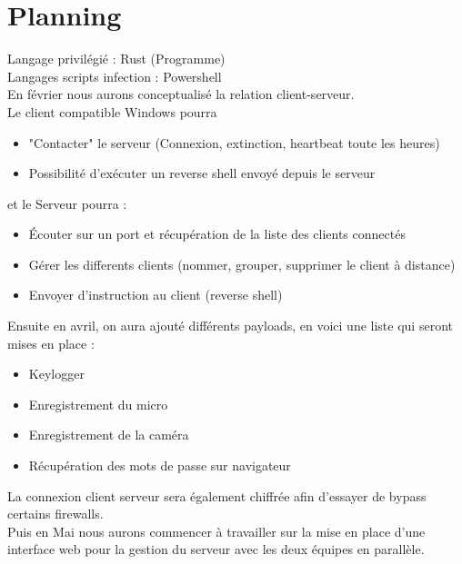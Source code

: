 \documentclass[a4paper]{article}
\begin{document}
   \section{Planning}
Langage privilégié : Rust (Programme)\\
Langages scripts infection : Powershell
\bigskip
\\
En février nous aurons conceptualisé la relation client-serveur.\\
Le client compatible Windows pourra
 \begin{itemize}
\item "Contacter" le serveur (Connexion, extinction, heartbeat toute les heures)
\item Possibilité d'exécuter un reverse shell envoyé depuis le serveur
\end{itemize}
et le Serveur pourra :
 \begin{itemize}
\item Écouter sur un port et récupération de la liste des clients connectés
\item Gérer les differents clients (nommer, grouper, supprimer le client à distance)
\item Envoyer d'instruction au client (reverse shell)
\end{itemize}
\bigskip
Ensuite en avril, on aura ajouté différents payloads, en voici une liste qui seront mises en place :
 \begin{itemize}
\item Keylogger
\item Enregistrement du micro
\item Enregistrement de la caméra
\item Récupération des mots de passe sur navigateur
\end{itemize}
La connexion client serveur sera également chiffrée afin d'essayer de bypass certains firewalls.
\bigskip
\\
Puis en Mai nous aurons commencer à travailler sur la mise en place d'une interface web pour la gestion du serveur avec les deux équipes en parallèle.
\newpage
\end{document}
